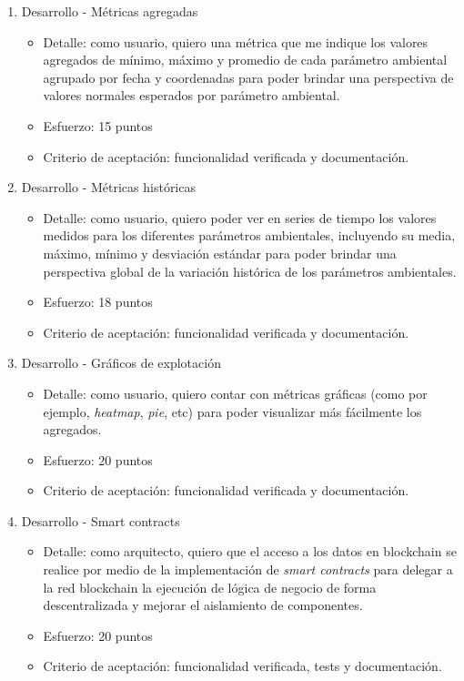 \documentclass[
11pt, %
]{charter}
\begin{document}
\begin{enumerate}
	\item Desarrollo - Métricas agregadas
	\begin{itemize}
		\item Detalle: como usuario, quiero una métrica que me indique los valores agregados de mínimo, máximo y promedio de cada parámetro ambiental agrupado por fecha y coordenadas para poder brindar una perspectiva de valores normales esperados por parámetro ambiental.
		\item Esfuerzo: 15 puntos
		\item Criterio de aceptación: funcionalidad verificada y documentación.
	\end{itemize}

	\item Desarrollo - Métricas históricas
	\begin{itemize}
		\item Detalle: como usuario, quiero poder ver en series de tiempo los valores medidos para los diferentes parámetros ambientales, incluyendo su media, máximo, mínimo y desviación estándar para poder brindar una perspectiva global de la variación histórica de los parámetros ambientales.
		\item Esfuerzo: 18 puntos
		\item Criterio de aceptación: funcionalidad verificada y documentación.
	\end{itemize}
	
	\item Desarrollo - Gráficos de explotación
	\begin{itemize}
		\item Detalle: como usuario, quiero contar con métricas gráficas (como por ejemplo, \textit{heatmap}, \textit{pie}, etc) para poder visualizar más fácilmente los agregados.
		\item Esfuerzo: 20 puntos
		\item Criterio de aceptación: funcionalidad verificada y documentación.
	\end{itemize}
	
	\item Desarrollo - Smart contracts
	\begin{itemize}
		\item Detalle: como arquitecto, quiero que el acceso a los datos en blockchain se realice por medio de la implementación de \textit{smart contracts} para delegar a la red blockchain la ejecución de lógica de negocio de forma descentralizada y mejorar el aislamiento de componentes.
		\item Esfuerzo: 20 puntos
		\item Criterio de aceptación: funcionalidad verificada, tests y documentación.
	\end{itemize}
	

\end{enumerate}
\end{document}
